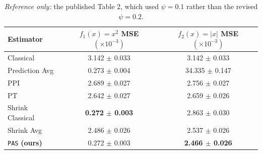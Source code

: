 \documentclass[11pt]{article}
\begin{document}
\begin{table}[H]
    \centering
    \caption{\emph{Reference only:} the published Table 2, which used $\psi=0.1$ rather than the revised $\psi=0.2$.}
    \label{tbl:published_synthetic}
    \vskip 0.05in
    \footnotesize
    \begin{tabular}{lcc}
    \toprule
    \textbf{Estimator} & \textbf{$f_1(x) = x^2$} \textbf{MSE} \( (\times 10^{-3}) \) & \textbf{$f_2(x) = |x|$} \textbf{MSE} \( (\times 10^{-3}) \) \\
    \midrule
    Classical & 3.142 $\pm$ 0.033 & 3.142 $\pm$ 0.033 \\
    Prediction Avg & 0.273 $\pm$ 0.004 & 34.335 $\pm$ 0.147 \\
    PPI & 2.689 $\pm$ 0.027 & 2.756 $\pm$ 0.027 \\
    PT & 2.642 $\pm$ 0.027 & 2.659 $\pm$ 0.026 \\
    Shrink Classical & \textbf{0.272 $\pm$ 0.003} & 2.863 $\pm$ 0.030 \\
    Shrink Avg & 2.486 $\pm$ 0.026 & 2.537 $\pm$ 0.026 \\
    \texttt{PAS} \textbf{(ours)} & 0.272 $\pm$ 0.003 & \textbf{2.466 $\pm$ 0.026} \\
    \bottomrule
    \end{tabular}
\end{table}
\end{document}
